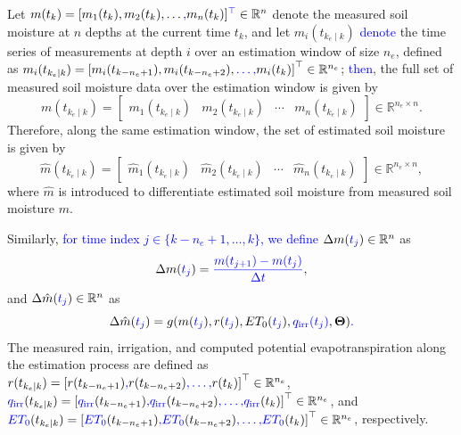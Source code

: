 \documentclass[pdflatex,sn-nature]{sn-jnl}%
\theoremstyle{thmstyleone}%
\theoremstyle{thmstyletwo}%
\theoremstyle{thmstylethree}%
\begin{document}
Let \( m(t_k) = [m_1(t_k), m_2(t_k), \dots\textcolor{blue}{,} m_n(t_k)]\textcolor{blue}{^\top} \in \mathbb{R}^{n} \) denote the measured soil moisture at $n$ depths at the current time \( t_k \), and let \( m_i(t_{k_e \mid k}) \) \textcolor{blue}{denote} the time series of measurements at depth \( i \) over an estimation window of size $n_e$, defined as  
${m_i(t_{k_e \mid k})}=\left[m_i(t_{k-n_e +1}), m_i(t_{k-n_e +2}), \textcolor{blue}{\dots,} m_i(t_{k}) \right]^\top \in \mathbb{R}^{n_e}$;
\textcolor{blue}{then}, the full set of measured soil moisture data over the estimation window is given by 
\[
m(t_{k_e \mid k}) = \begin{bmatrix}
m_1(t_{k_e \mid k}) & m_2(t_{k_e \mid k}) & \cdots & m_n(t_{k_e \mid k})
\end{bmatrix} \in \mathbb{R}^{n_e \times n}. 
\] 
Therefore, along the same estimation window, the set of estimated soil moisture is given by  
\[
\hat{m}(t_{k_e \mid k}) = \begin{bmatrix}
\hat{m}_1(t_{k_e \mid k}) & \hat{m}_2(t_{k_e \mid k}) & \cdots & \hat{m}_n(t_{k_e \mid k})
\end{bmatrix} \in \mathbb{R}^{n_e \times n}, 
\] 
where $\hat{m}$ is introduced to differentiate estimated soil moisture from measured soil moisture $m$. 

Similarly, \textcolor{blue}{for time index $j \in \{k - n_e + 1, \dots, k\}$, we define} $\Delta m(\textcolor{blue}{t_j}) \in \mathbb{R}^{n}$ as 
\[
\Delta m(\textcolor{blue}{t_j}) = \textcolor{blue}{\frac{m(t_{j+1})-m(t_j)}{\Delta t}},
\]
and $\Delta \hat{m}(\textcolor{blue}{t_j}) \in \mathbb{R}^{n}$ as 
\[
\Delta \hat{m}(\textcolor{blue}{t_j}) = g(m(\textcolor{blue}{t_j}),r(\textcolor{blue}{t_j}),ET_0(\textcolor{blue}{t_j}),\textcolor{blue}{q_{\mathrm{irr}}(t_j)},\boldsymbol{\Theta})\textcolor{blue}{.}
\]
The measured rain, irrigation, and computed potential evapotranspiration along the estimation process are defined as 
${r(t_{k_e \mid k})}=\left[r(t_{k-n_e +1})\textcolor{blue}{,} r(t_{k-n_e +2})\textcolor{blue}{, \dots,} r(t_{k}) \right]^\top \in \mathbb{R}^{n_e}$, 
${\textcolor{blue}{q_{\mathrm{irr}}}(t_{k_e \mid k})}=\left[\textcolor{blue}{q_{\mathrm{irr}}}(t_{k-n_e +1})\textcolor{blue}{,} \textcolor{blue}{q_{\mathrm{irr}}}(t_{k-n_e +2})\textcolor{blue}{, \dots,} \textcolor{blue}{q_{\mathrm{irr}}}(t_{k}) \right]^\top \in \mathbb{R}^{n_e}$,
and 
${\textcolor{blue}{ET_0}(t_{k_e \mid k})}=\left[\textcolor{blue}{ET_0}(t_{k-n_e +1})\textcolor{blue}{,} \textcolor{blue}{ET_0}(t_{k-n_e +2})\textcolor{blue}{, \dots,} \textcolor{blue}{ET_0}(t_{k}) \right]^\top \in \mathbb{R}^{n_e}$, 
respectively. 
\end{document}
